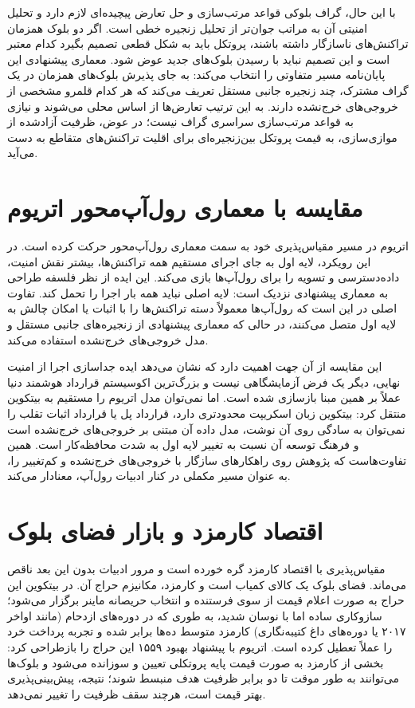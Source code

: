 با این حال، گراف بلوکی قواعد مرتب‌سازی و حل تعارض پیچیده‌ای لازم دارد و تحلیل امنیتی آن به مراتب جوان‌تر از تحلیل زنجیره خطی است. اگر دو بلوک همزمان تراکنش‌های ناسازگار داشته باشند، پروتکل باید به شکل قطعی تصمیم بگیرد کدام معتبر است و این تصمیم نباید با رسیدن بلوک‌های جدید عوض شود. معماری پیشنهادی این پایان‌نامه مسیر متفاوتی را انتخاب می‌کند: به جای پذیرش بلوک‌های همزمان در یک گراف مشترک، چند زنجیره جانبی مستقل تعریف می‌کند که هر کدام قلمرو مشخصی از خروجی‌های خرج‌نشده دارند. به این ترتیب تعارض‌ها از اساس محلی می‌شوند و نیازی به قواعد مرتب‌سازی سراسری گراف نیست؛ در عوض، ظرفیت آزادشده از موازی‌سازی، به قیمت پروتکل بین‌زنجیره‌ای برای اقلیت تراکنش‌های متقاطع به دست می‌آید.

\section{مقایسه با معماری رول‌آپ‌محور اتریوم}

اتریوم در مسیر مقیاس‌پذیری خود به سمت معماری رول‌آپ‌محور حرکت کرده است. در این رویکرد، لایه اول به جای اجرای مستقیم همه تراکنش‌ها، بیشتر نقش امنیت، داده‌دسترسی و تسویه را برای رول‌آپ‌ها بازی می‌کند. این ایده از نظر فلسفه طراحی به معماری پیشنهادی نزدیک است: لایه اصلی نباید همه بار اجرا را تحمل کند. تفاوت اصلی در این است که رول‌آپ‌ها معمولاً دسته تراکنش‌ها را با اثبات یا امکان چالش به لایه اول متصل می‌کنند، در حالی که معماری پیشنهادی از زنجیره‌های جانبی مستقل و مدل خروجی‌های خرج‌نشده استفاده می‌کند.

این مقایسه از آن جهت اهمیت دارد که نشان می‌دهد ایده جداسازی اجرا از امنیت نهایی، دیگر یک فرض آزمایشگاهی نیست و بزرگ‌ترین اکوسیستم قرارداد هوشمند دنیا عملاً بر همین مبنا بازسازی شده است. اما نمی‌توان مدل اتریوم را مستقیم به بیتکوین منتقل کرد: بیتکوین زبان اسکریپت محدودتری دارد، قرارداد پل یا قرارداد اثبات تقلب را نمی‌توان به سادگی روی آن نوشت، مدل داده آن مبتنی بر خروجی‌های خرج‌نشده است و فرهنگ توسعه آن نسبت به تغییر لایه اول به شدت محافظه‌کار است. همین تفاوت‌هاست که پژوهش روی راهکارهای سازگار با خروجی‌های خرج‌نشده و کم‌تغییر را، به عنوان مسیر مکملی در کنار ادبیات رول‌آپ، معنادار می‌کند.

\section{اقتصاد کارمزد و بازار فضای بلوک}

مقیاس‌پذیری با اقتصاد کارمزد گره خورده است و مرور ادبیات بدون این بعد ناقص می‌ماند. فضای بلوک یک کالای کمیاب است و کارمزد، مکانیزم حراج آن. در بیتکوین این حراج به صورت اعلام قیمت از سوی فرستنده و انتخاب حریصانه ماینر برگزار می‌شود؛ سازوکاری ساده اما با نوسان شدید، به طوری که در دوره‌های ازدحام (مانند اواخر ۲۰۱۷ یا دوره‌های داغ کتیبه‌نگاری) کارمزد متوسط ده‌ها برابر شده و تجربه پرداخت خرد را عملاً تعطیل کرده است. اتریوم با پیشنهاد بهبود ۱۵۵۹ این حراج را بازطراحی کرد: بخشی از کارمزد به صورت قیمت پایه پروتکلی تعیین و سوزانده می‌شود و بلوک‌ها می‌توانند به طور موقت تا دو برابر ظرفیت هدف منبسط شوند؛ نتیجه، پیش‌بینی‌پذیری بهتر قیمت است، هرچند سقف ظرفیت را تغییر نمی‌دهد.

